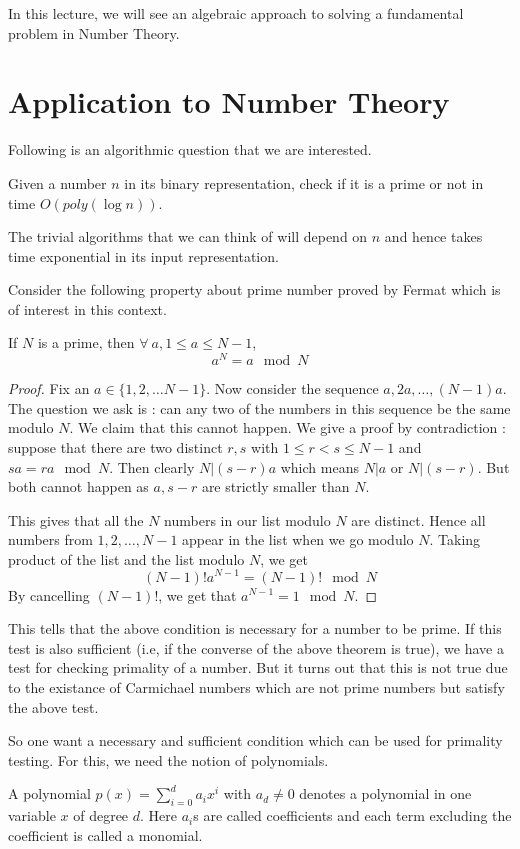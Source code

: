 In this lecture, we will see an algebraic approach to solving a fundamental
problem in Number Theory.
\section{Application to Number Theory}
Following is an algorithmic question that we are interested.
\begin{problem}
Given a number $n$ in its binary representation, check if it is a prime or not
in time $O(poly(\log n))$.
\end{problem}
\begin{note}
The trivial algorithms that we can think of will depend on $n$ and hence takes
time exponential in its input representation.
\end{note}

Consider the following property about prime number proved by Fermat which is
of interest in this context.
\begin{theorem} If $N$ is a prime, then $\forall~a, 1
	\le a \le N-1$, \[ a^N = a \mod N \]
\end{theorem}
\begin{proof}
	Fix an $a \in \{1,2,\ldots N-1\}$. Now consider the sequence $a, 2a,
	\ldots, (N-1)a$. The question we ask is : can any two of the numbers
	in this sequence be the same modulo $N$. We claim that this cannot
	happen. We give a proof by contradiction : suppose that there are two
	distinct $r,s$ with $1 \le r < s \le N-1$ and $sa = ra \mod N$. Then
	clearly $N | (s-r)a$ which means $N | a$ or $N | (s-r)$. But both
	cannot happen as $a, s-r$ are strictly smaller than $N$.

	This gives that all the $N$ numbers in our list modulo $N$ are
	distinct. Hence all numbers from $1,2,\ldots, N-1$ appear in the list
	when we go modulo $N$. Taking product of the list and the list modulo
	$N$, we get 
	\[ (N-1)! a^{N-1} = (N-1)! \mod N \]
	By cancelling $(N-1)!$, we get that $a^{N-1} = 1 \mod N$.
\end{proof}
This tells that the above condition is necessary for a number to be prime. If
this test is also sufficient (i.e, if the converse of the above theorem is
true), we have a test for checking primality of a number. But it turns out
that this is not true due to the existance of Carmichael numbers which are not
prime numbers but satisfy the above test.

So one want a necessary and sufficient condition which can be used for
primality testing. For this, we need the notion of polynomials.
\begin{definition}
	A polynomial $p(x) = \sum_{i=0}^d a_ix^i$ with $a_d \ne 0$ denotes a
	polynomial in one variable $x$ of degree $d$. Here $a_i$s are called
	coefficients and each term excluding the coefficient is called a
	monomial.
\end{definition}


